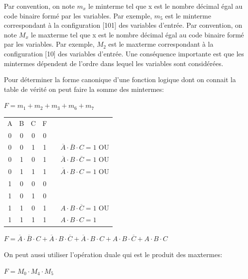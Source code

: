 Par convention, on note $m_{x}$ le minterme tel que x est le nombre décimal égal au code binaire formé par les variables. Par exemple, $m_{5}$ est le minterme correspondant à la configuration [101] des variables d'entrée.
Par convention, on note $M_{x}$ le maxterme tel que x est le nombre décimal égal au code binaire formé par les variables. Par exemple, $M_{2}$ est le maxterme correspondant à la configuration [10] des variables d'entrée.
Une conséquence importante est que les mintermes dépendent de l'ordre dans lequel les variables sont considérées.

Pour déterminer la forme canonique d'une fonction logique dont on connait la table de vérité on peut faire la somme des mintermes:
\begin{center}
$F = m_1 + m_2 + m_3 + m_6 + m_7$
\end{center}

\begin{center}
\begin{tabular}{*{3}{|c} ||c| p{1cm} p{5cm}}
A & B & C & F\\
0 & 0 & 0 & 0\\
0 & 0 & 1 & 1 & & $\overline{A} \cdot \overline{B} \cdot C = 1$ OU\\
0 & 1 & 0 & 1 & & $\overline{A} \cdot B \cdot \overline{C} = 1$ OU\\
0 & 1 & 1 & 1 & & $\overline{A} \cdot B \cdot C = 1$ OU\\
1 & 0 & 0 & 0\\
1 & 0 & 1 & 0\\
1 & 1 & 0 & 1 & & $A \cdot B \cdot \overline{C} = 1$ OU\\
1 & 1 & 1 & 1 & & $A \cdot B \cdot C = 1$\\
\end{tabular}
\end{center}

\begin{center}
$F = \overline{A} \cdot \overline{B} \cdot C + \overline{A} \cdot B \cdot \overline{C} + \overline{A} \cdot B \cdot C + 
A \cdot B \cdot \overline{C} + A \cdot B \cdot C$
\end{center}

On peut aussi utiliser l'opération duale qui est le produit des maxtermes:
\begin{center}
$F = M_0 \cdot M_4 \cdot M_5$
\end{center}


